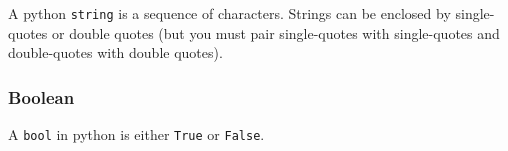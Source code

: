 A python \texttt{string} is a sequence of characters. Strings can be
enclosed by single-quotes or double quotes (but you must pair
single-quotes with single-quotes and double-quotes with double quotes).

\begin{Shaded}
\begin{Highlighting}[]
\NormalTok{(}\NormalTok{)}
\end{Highlighting}
\end{Shaded}

\begin{Shaded}
\begin{Highlighting}[]
\end{Highlighting}
\end{Shaded}

\begin{Shaded}
\begin{Highlighting}[]
\NormalTok{(}\NormalTok{)}
\end{Highlighting}
\end{Shaded}

\begin{Shaded}
\begin{Highlighting}[]
\end{Highlighting}
\end{Shaded}

\subsubsection{Boolean}\label{python-introduction.md__boolean}

A \texttt{bool} in python is either \texttt{True} or \texttt{False}.

\begin{Shaded}
\begin{Highlighting}[]
\NormalTok{(}\NormalTok{)}
\end{Highlighting}
\end{Shaded}

\begin{Shaded}
\begin{Highlighting}[]
\end{Highlighting}
\end{Shaded}

\begin{Shaded}
\begin{Highlighting}[]
\NormalTok{(}\NormalTok{)}
\end{Highlighting}
\end{Shaded}

